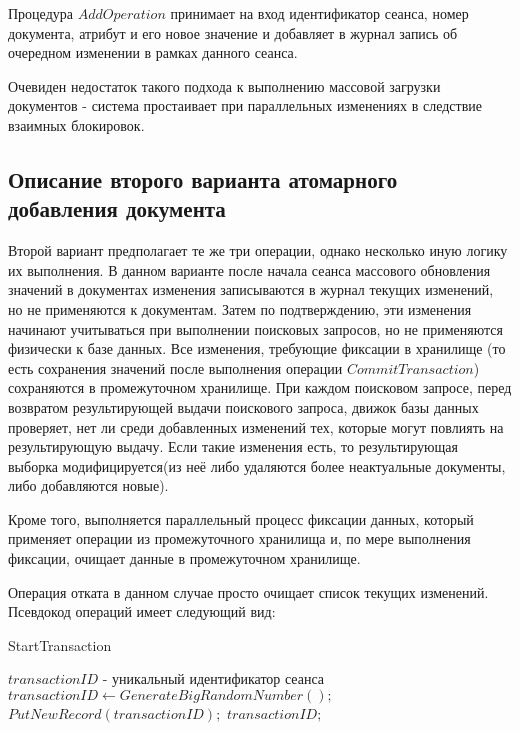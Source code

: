 \documentclass{matmex-diploma}
\begin{document}
        Процедура $AddOperation$ принимает на вход идентификатор сеанса, номер документа, атрибут и его новое значение и добавляет в журнал запись об очередном изменении в рамках данного сеанса.
        
        Очевиден недостаток такого подхода к выполнению массовой загрузки документов - система простаивает при параллельных изменениях в следствие взаимных блокировок.
    \subsection{Описание второго варианта атомарного добавления документа}
        Второй вариант предполагает те же три операции, однако несколько иную логику их выполнения. В данном варианте после начала сеанса массового обновления значений в документах изменения записываются в журнал текущих изменений, но не применяются к документам. Затем по подтверждению, эти изменения начинают учитываться при выполнении поисковых запросов, но не применяются физически к базе данных. 
        Все изменения, требующие фиксации в хранилище (то есть сохранения значений после выполнения операции $CommitTransaction$) сохраняются в промежуточном хранилище.
        При каждом поисковом запросе, перед возвратом результирующей выдачи поискового запроса, движок базы данных проверяет, нет ли среди добавленных изменений тех, которые могут повлиять на результирующую выдачу. Если такие изменения есть, то результирующая выборка модифицируется(из неё либо удаляются более неактуальные документы, либо добавляются новые). 
        
        Кроме того, выполняется параллельный процесс фиксации данных, который применяет операции из промежуточного хранилища и, по мере выполнения фиксации, очищает данные в промежуточном хранилище.
        
        Операция отката в данном случае просто очищает список текущих изменений. Псевдокод операций имеет следующий вид:
        
        \begin{algorithm}[H]                   
        \caption{StartTransaction}              
        \label{startTran2}                        
            \begin{algorithmic}        
                \ENSURE $transactionID$ - уникальный идентификатор сеанса
                \STATE $transactionID \leftarrow GenerateBigRandomNumber();$
                \STATE $PutNewRecord(transactionID);$
                \RETURN $transactionID;$
            \end{algorithmic}
        \end{algorithm}
        
\end{document}
